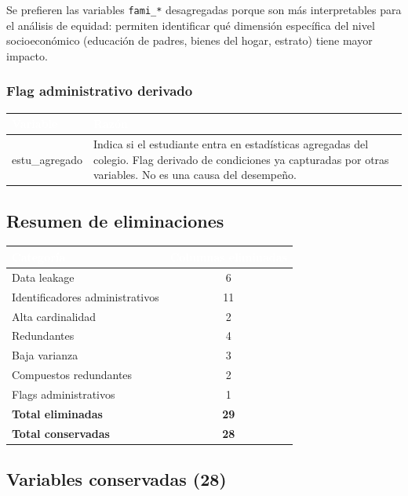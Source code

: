 \documentclass[12pt, a4paper]{article}
\newcommand{\thead}[1]{\cellcolor{tabheader}\textcolor{white}{\textbf{#1}}}
\begin{document}
Se prefieren las variables \texttt{fami\_*} desagregadas porque son más
interpretables para el análisis de equidad: permiten identificar qué dimensión
específica del nivel socioeconómico (educación de padres, bienes del hogar,
estrato) tiene mayor impacto.

\subsubsection{Flag administrativo derivado}

\vspace{4pt}
\begin{tabularx}{\textwidth}{>{\ttfamily}l X}
  \toprule
  \thead{Variable} & \thead{Razón} \\
  \midrule
  \rowcolor{rowalt}
  estu\_agregado & Indica si el estudiante entra en estadísticas agregadas del colegio. Flag derivado de condiciones ya capturadas por otras variables. No es una causa del desempeño. \\
  \bottomrule
\end{tabularx}

\subsection{Resumen de eliminaciones}

\vspace{4pt}
\begin{tabular}{lc}
  \toprule
  \thead{Categoría} & \thead{Columnas eliminadas} \\
  \midrule
  \rowcolor{rowalt}
  Data leakage                    & 6  \\
  Identificadores administrativos & 11 \\
  \rowcolor{rowalt}
  Alta cardinalidad               & 2  \\
  Redundantes                     & 4  \\
  \rowcolor{rowalt}
  Baja varianza                   & 3  \\
  Compuestos redundantes          & 2  \\
  \rowcolor{rowalt}
  Flags administrativos           & 1  \\
  \midrule
  \textbf{Total eliminadas}       & \textbf{29} \\
  \textbf{Total conservadas}      & \textbf{28} \\
  \bottomrule
\end{tabular}

\subsection{Variables conservadas (28)}
\end{document}
